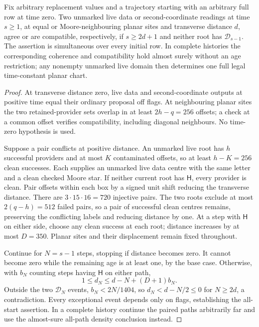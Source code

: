 \begin{lemma}\label{lem:lower-coherence}
Fix arbitrary replacement values and a trajectory starting with an arbitrary full row at time zero. Two unmarked live data or second-coordinate readings at time $s\ge1$, at equal or Moore-neighbouring planar sites and transverse distance $d$, agree or are compatible, respectively, if $s\ge2d+1$ and neither root has $\mathcal D_{s-1}$. The assertion is simultaneous over every initial row. In complete histories the corresponding coherence and compatibility hold almost surely without an age restriction; any nonempty unmarked live domain then determines one full legal time-constant planar chart.
\end{lemma}
\begin{proof}
At transverse distance zero, live data and second-coordinate outputs at positive time equal their ordinary proposal off flags. At neighbouring planar sites the two retained-provider sets overlap in at least $2h-q=256$ offsets; a check at a common offset verifies compatibility, including diagonal neighbours. No time-zero hypothesis is used.

Suppose a pair conflicts at positive distance. An unmarked live root has $h$ successful providers and at most $K$ contaminated offsets, so at least $h-K=256$ clean successes. Each supplies an unmarked live data centre with the same letter and a clean checked Moore star. If neither current root has $\mathsf H$, every provider is clean. Pair offsets within each box by a signed unit shift reducing the transverse distance. There are $3\cdot15\cdot16=720$ injective pairs. The two roots exclude at most $2(q-h)=512$ failed pairs, so a pair of successful clean centres remains, preserving the conflicting labels and reducing distance by one. At a step with $\mathsf H$ on either side, choose any clean success at each root; distance increases by at most $D=350$. Planar sites and their displacement remain fixed throughout.

Continue for $N=s-1$ steps, stopping if distance becomes zero. It cannot become zero while the remaining age is at least one, by the base case. Otherwise, with $b_N$ counting steps having $\mathsf H$ on either path,
\[
 1\le d_N\le d-N+(D+1)b_N.
\]
Outside the two $\mathcal D_N$ events, $b_N<2N/1404$, so $d_N<d-N/2\le0$ for $N\ge2d$, a contradiction. Every exceptional event depends only on flags, establishing the all-start assertion. In a complete history continue the paired paths arbitrarily far and use the almost-sure all-path density conclusion instead.


\end{proof}
